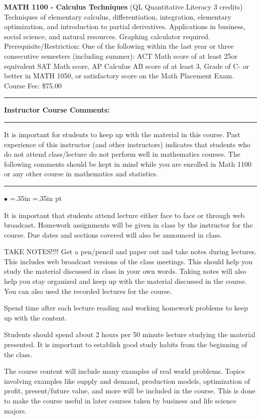 \documentclass[10pt,fleqn]{article}
\begin{document}
\vskip0.1in

\noindent
{\bf MATH 1100 - Calculus Techniques} (QL Quantitative Literacy 3 credits)
Techniques of elementary calculus, differentiation, integration, elementary
optimization, and introduction to partial derivatives. Applications in business,
social science, and natural resources. Graphing calculator required.
Prerequisite/Restriction: One of the following within the last year or three
consecutive semesters (including summer): ACT Math score of at least 25or
equivalent SAT Math score, AP Calculus AB score of at least 3, Grade of C- or
better in MATH 1050, or satisfactory score on the Math Placement Exam. Course
Fee: \$75.00
\vskip0.1in\hrule\vskip0.1in \noindent
{\bf Instructor Course Comments:}
\vskip0.1in\hrule\vskip0.1in
\noindent
It is important for students to keep up with the material in this course. Past
experience of this instructor (and other instructors) indicates that students
who do not attend class/lecture do not perform well in mathematics courses. The
following comments should be kept in mind while you are enrolled in Math 1100
or any other course in mathematics and statistics.
\vskip0.1in\hrule\vskip0.1in\noindent
\begin{list}{$\bullet$}{ \parsep=0pt \listparindent=0pt
\topsep=0pt \rightmargin=.35in \leftmargin=.35in   pt \itemsep=2pt}
  \item It is important that students attend lecture either face to face or
        through web broadcast. Homework assignments will be given in class by
        the instructor for the course. Due dates and sections covered will also
        be announced in class.
  \item TAKE NOTES!!!! Get a pen/pencil and paper out and take notes during
        lectures. This includes web broadcast versions of the class meetings.
        This should help you study the material discussed in class in
        your own words. Taking notes will also help you stay organized and keep
        up with the material discussed in the course. You can also used the
        recorded lectures for the course.
  \item Spend time after each lecture reading and working homework problems to
        keep up with the content.
  \item Students should spend about 2 hours per 50 minute lecture studying the
        material presented. It is important to establish good study habits from
        the beginning of the class.
  \item The course content will include many examples of real world problems.
        Topics involving examples like supply and demand, production models,
        optimization of profit, present/future value, and more will be included
        in the course. This is done to make the course useful in later courses
        taken by business and life science majors.
\end{list}
\end{document}
